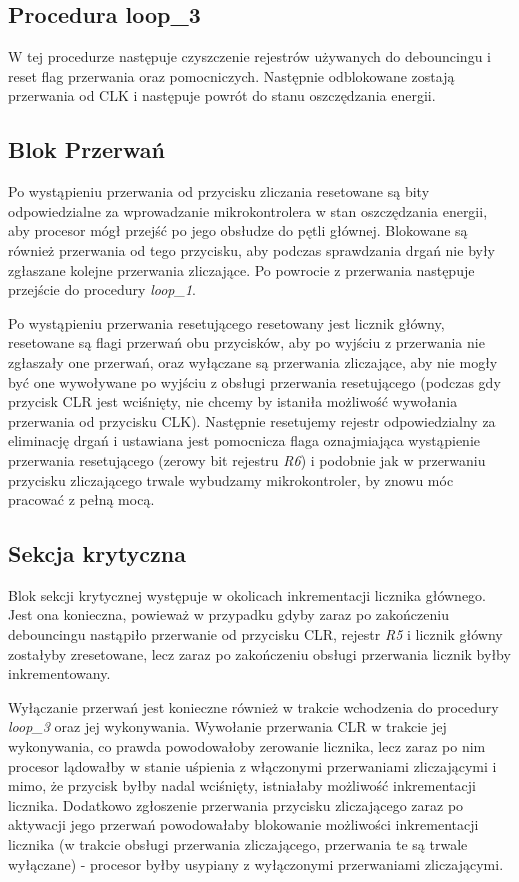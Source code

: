 \documentclass[fleqn]{article}
\begin{document}
\subsection{Procedura loop\_3}
		W tej procedurze następuje czyszczenie rejestrów używanych do debouncingu i reset flag przerwania oraz pomocniczych. Następnie odblokowane zostają przerwania od CLK i następuje powrót do stanu oszczędzania energii.

\subsection{Blok Przerwań}
		Po wystąpieniu przerwania od przycisku zliczania resetowane są bity odpowiedzialne za wprowadzanie mikrokontrolera w stan oszczędzania energii, aby procesor mógł przejść po jego obsłudze do pętli głównej. Blokowane są również przerwania od tego przycisku, aby podczas sprawdzania drgań nie były zgłaszane kolejne przerwania zliczające. Po powrocie z przerwania następuje przejście do procedury \textit{loop\_1}.

		Po wystąpieniu przerwania resetującego resetowany jest licznik główny, resetowane są flagi przerwań obu przycisków, aby po wyjściu z przerwania nie zgłaszały one przerwań, oraz wyłączane są przerwania zliczające, aby nie mogły być one wywoływane po wyjściu z obsługi przerwania resetującego (podczas gdy przycisk CLR jest wciśnięty, nie chcemy by istaniła możliwość wywołania przerwania od przycisku CLK). Następnie resetujemy rejestr odpowiedzialny za eliminację drgań i ustawiana jest pomocnicza flaga oznajmiająca wystąpienie przerwania resetującego (zerowy bit rejestru \textit{R6}) i podobnie jak w przerwaniu przycisku zliczającego trwale wybudzamy mikrokontroler, by znowu móc pracować z pełną mocą.

\subsection{Sekcja krytyczna}
		Blok sekcji krytycznej występuje w okolicach inkrementacji licznika głównego. Jest ona konieczna, powieważ w przypadku gdyby zaraz po zakończeniu debouncingu nastąpiło przerwanie od przycisku CLR, rejestr \textit{R5} i licznik główny zostałyby zresetowane, lecz zaraz po zakończeniu obsługi przerwania licznik byłby inkrementowany.

		Wyłączanie przerwań jest konieczne również w trakcie wchodzenia do procedury \textit{loop\_3} oraz jej wykonywania. Wywołanie przerwania CLR w trakcie jej wykonywania, co prawda powodowałoby zerowanie licznika, lecz zaraz po nim procesor lądowałby w stanie uśpienia z włączonymi przerwaniami zliczającymi i mimo, że przycisk byłby nadal wciśnięty, istniałaby możliwość inkrementacji licznika. Dodatkowo zgłoszenie przerwania przycisku zliczającego zaraz po aktywacji jego przerwań powodowałaby blokowanie możliwości inkrementacji licznika (w trakcie obsługi przerwania zliczającego, przerwania te są trwale wyłączane) - procesor byłby usypiany z wyłączonymi przerwaniami zliczającymi.
\end{document}
